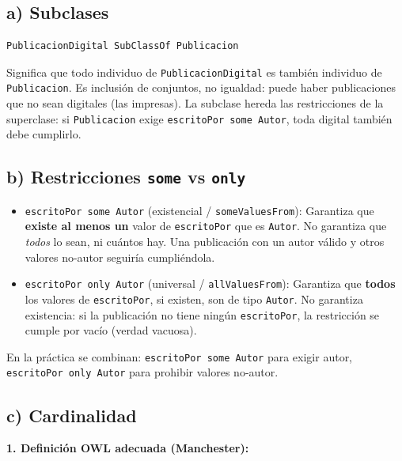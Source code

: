 \subsection{a) Subclases}\label{a-subclases}

\begin{verbatim}
PublicacionDigital SubClassOf Publicacion
\end{verbatim}

Significa que todo individuo de \texttt{PublicacionDigital} es también
individuo de \texttt{Publicacion}. Es inclusión de conjuntos, no
igualdad: puede haber publicaciones que no sean digitales (las
impresas). La subclase hereda las restricciones de la superclase: si
\texttt{Publicacion} exige \texttt{escritoPor\ some\ Autor}, toda
digital también debe cumplirlo.

\subsection{\texorpdfstring{b) Restricciones \texttt{some} vs
\texttt{only}}{b) Restricciones some vs only}}\label{b-restricciones-some-vs-only}

\begin{itemize}
\item
  \texttt{escritoPor\ some\ Autor} (existencial /
  \texttt{someValuesFrom}): Garantiza que \textbf{existe al menos un}
  valor de \texttt{escritoPor} que es \texttt{Autor}. No garantiza que
  \emph{todos} lo sean, ni cuántos hay. Una publicación con un autor
  válido y otros valores no-autor seguiría cumpliéndola.
\item
  \texttt{escritoPor\ only\ Autor} (universal / \texttt{allValuesFrom}):
  Garantiza que \textbf{todos} los valores de \texttt{escritoPor}, si
  existen, son de tipo \texttt{Autor}. No garantiza existencia: si la
  publicación no tiene ningún \texttt{escritoPor}, la restricción se
  cumple por vacío (verdad vacuosa).
\end{itemize}

En la práctica se combinan: \texttt{escritoPor\ some\ Autor} para exigir
autor, \texttt{escritoPor\ only\ Autor} para prohibir valores no-autor.

\subsection{c) Cardinalidad}\label{c-cardinalidad}

\textbf{1. Definición OWL adecuada (Manchester):}

